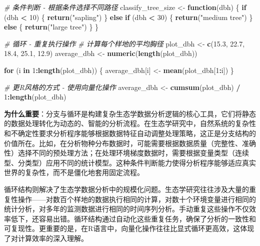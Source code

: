 \documentclass[
]{book}
\newenvironment{Shaded}{\begin{snugshade}}{\end{snugshade}}
\newcommand{\CommentTok}[1]{\textcolor[rgb]{0.56,0.35,0.01}{\textit{#1}}}
\newcommand{\ControlFlowTok}[1]{\textcolor[rgb]{0.13,0.29,0.53}{\textbf{#1}}}
\newcommand{\DecValTok}[1]{\textcolor[rgb]{0.00,0.00,0.81}{#1}}
\newcommand{\FloatTok}[1]{\textcolor[rgb]{0.00,0.00,0.81}{#1}}
\newcommand{\FunctionTok}[1]{\textcolor[rgb]{0.13,0.29,0.53}{\textbf{#1}}}
\newcommand{\NormalTok}[1]{#1}
\newcommand{\OtherTok}[1]{\textcolor[rgb]{0.56,0.35,0.01}{#1}}
\newcommand{\SpecialCharTok}[1]{\textcolor[rgb]{0.81,0.36,0.00}{\textbf{#1}}}
\newcommand{\StringTok}[1]{\textcolor[rgb]{0.31,0.60,0.02}{#1}}
\begin{document}
\begin{Shaded}
\begin{Highlighting}[]
\CommentTok{\# 条件判断 {-} 根据条件选择不同路径}
\NormalTok{classify\_tree\_size }\OtherTok{\textless{}{-}} \ControlFlowTok{function}\NormalTok{(dbh) \{}
  \ControlFlowTok{if}\NormalTok{ (dbh }\SpecialCharTok{\textless{}} \DecValTok{10}\NormalTok{) \{}
    \FunctionTok{return}\NormalTok{(}\StringTok{"sapling"}\NormalTok{)}
\NormalTok{  \} }\ControlFlowTok{else} \ControlFlowTok{if}\NormalTok{ (dbh }\SpecialCharTok{\textless{}} \DecValTok{30}\NormalTok{) \{}
    \FunctionTok{return}\NormalTok{(}\StringTok{"medium tree"}\NormalTok{)}
\NormalTok{  \} }\ControlFlowTok{else}\NormalTok{ \{}
    \FunctionTok{return}\NormalTok{(}\StringTok{"large tree"}\NormalTok{)}
\NormalTok{  \}}
\NormalTok{\}}

\CommentTok{\# 循环 {-} 重复执行操作}
\CommentTok{\# 计算每个样地的平均胸径}
\NormalTok{plot\_dbh }\OtherTok{\textless{}{-}} \FunctionTok{c}\NormalTok{(}\FloatTok{15.3}\NormalTok{, }\FloatTok{22.7}\NormalTok{, }\FloatTok{18.4}\NormalTok{, }\FloatTok{25.1}\NormalTok{, }\FloatTok{12.9}\NormalTok{)}
\NormalTok{average\_dbh }\OtherTok{\textless{}{-}} \FunctionTok{numeric}\NormalTok{(}\FunctionTok{length}\NormalTok{(plot\_dbh))}

\ControlFlowTok{for}\NormalTok{ (i }\ControlFlowTok{in} \DecValTok{1}\SpecialCharTok{:}\FunctionTok{length}\NormalTok{(plot\_dbh)) \{}
\NormalTok{  average\_dbh[i] }\OtherTok{\textless{}{-}} \FunctionTok{mean}\NormalTok{(plot\_dbh[}\DecValTok{1}\SpecialCharTok{:}\NormalTok{i])}
\NormalTok{\}}

\CommentTok{\# 更R风格的方式 {-} 使用向量化操作}
\NormalTok{average\_dbh }\OtherTok{\textless{}{-}} \FunctionTok{cumsum}\NormalTok{(plot\_dbh) }\SpecialCharTok{/} \DecValTok{1}\SpecialCharTok{:}\FunctionTok{length}\NormalTok{(plot\_dbh)}
\end{Highlighting}
\end{Shaded}

\textbf{为什么重要}：分支与循环是构建复杂生态学数据分析逻辑的核心工具，它们将静态的数据处理转化为动态的、智能的分析流程。在生态学研究中，自然系统的复杂性和不确定性要求分析程序能够根据数据特征自动调整处理策略，这正是分支结构的价值所在。比如，在分析物种分布数据时，可能需要根据数据质量（完整性、准确性）选择不同的预处理方法；在处理环境梯度数据时，需要根据变量类型（连续型、分类型）应用不同的统计模型。这种条件判断能力使得分析程序能够适应真实世界的复杂性，而不是僵化地套用固定流程。

循环结构则解决了生态学数据分析中的规模化问题。生态学研究往往涉及大量的重复性操作------对数百个样地的数据执行相同的计算，对数十个环境变量进行相同的统计分析，对多年的监测数据进行相同的时间序列分析。手动重复这些操作不仅效率低下，还容易出错。循环结构通过自动化这些重复任务，确保了分析的一致性和可复现性。更重要的是，在R语言中，向量化操作往往比显式循环更高效，这体现了对计算效率的深入理解。
\end{document}
